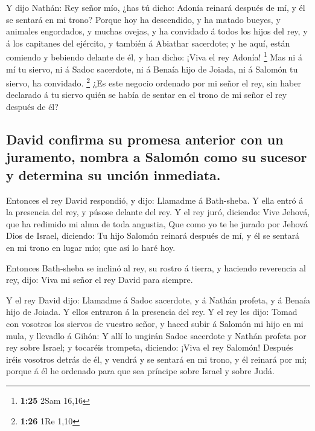 Y dijo Nathán: Rey señor mío, ¿has tú dicho: Adonía
reinará después de mí, y él se sentará en mi trono? 
Porque hoy ha descendido, y ha matado bueyes, y animales engordados, y
muchas ovejas, y ha convidado á todos los hijos del rey, y á los
capitanes del ejército, y también á Abiathar sacerdote; y he aquí, están
comiendo y bebiendo delante de él, y han dicho: ¡Viva el rey Adonía!
\footnote{\textbf{1:25} 2Sam 16,16}  Mas ni á mí tu
siervo, ni á Sadoc sacerdote, ni á Benaía hijo de Joiada, ni á Salomón
tu siervo, ha convidado. \footnote{\textbf{1:26} 1Re 1,10}
 ¿Es este negocio ordenado por mi señor el rey, sin haber
declarado á tu siervo quién se había de sentar en el trono de mi señor
el rey después de él?

\hypertarget{david-confirma-su-promesa-anterior-con-un-juramento-nombra-a-salomuxf3n-como-su-sucesor-y-determina-su-unciuxf3n-inmediata.}{%
\subsection{David confirma su promesa anterior con un juramento, nombra
a Salomón como su sucesor y determina su unción
inmediata.}\label{david-confirma-su-promesa-anterior-con-un-juramento-nombra-a-salomuxf3n-como-su-sucesor-y-determina-su-unciuxf3n-inmediata.}}

 Entonces el rey David respondió, y dijo: Llamadme á
Bath-sheba. Y ella entró á la presencia del rey, y púsose delante del
rey.  Y el rey juró, diciendo: Vive Jehová, que ha
redimido mi alma de toda angustia,  Que como yo te he
jurado por Jehová Dios de Israel, diciendo: Tu hijo Salomón reinará
después de mí, y él se sentará en mi trono en lugar mío; que así lo haré
hoy.

 Entonces Bath-sheba se inclinó al rey, su rostro á
tierra, y haciendo reverencia al rey, dijo: Viva mi señor el rey David
para siempre.

 Y el rey David dijo: Llamadme á Sadoc sacerdote, y á
Nathán profeta, y á Benaía hijo de Joiada. Y ellos entraron á la
presencia del rey.  Y el rey les dijo: Tomad con vosotros
los siervos de vuestro señor, y haced subir á Salomón mi hijo en mi
mula, y llevadlo á Gihón:  Y allí lo ungirán Sadoc
sacerdote y Nathán profeta por rey sobre Israel; y tocaréis trompeta,
diciendo: ¡Viva el rey Salomón!  Después iréis vosotros
detrás de él, y vendrá y se sentará en mi trono, y él reinará por mí;
porque á él he ordenado para que sea príncipe sobre Israel y sobre Judá.

